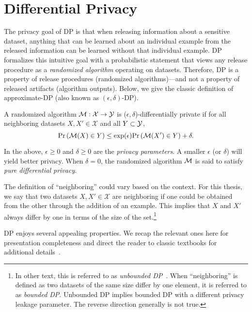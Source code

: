 \section{Differential Privacy}
The privacy goal of DP is that when releasing information about a sensitive dataset, anything that can be learned about an individual example from the released information can be learned without that individual example.
DP formalizes this intuitive goal with a probabilistic statement that views any release procedure as a \emph{randomized algorithm} operating on datasets.
Therefore, DP is a property of release procedures (randomized algorithms)---and not a property of released artifacts (algorithm outputs).
Below, we give the classic definition of approximate-DP (also known as $(\epsilon, \delta)$-DP).
\begin{defi}[Approximate-DP]
A randomized algorithm $\mathcal{M}: \mathcal{X} \to \mathcal{Y}$ is ($\epsilon, \delta$)-differentially private if for all neighboring datasets $X, X'\in\mathcal{X}$ and all $Y \subset \mathcal{Y}$, 
$$
\mathrm{Pr}\left(\mathcal{M}(X) \in Y\right) \le \exp( \epsilon ) \mathrm{Pr}\left( \mathcal{M}(X') \in Y \right) + \delta.
\label{eq:epsilon_delta_dp}
$$
\end{defi}
In the above, $\epsilon \ge 0$ and $\delta \ge 0$ are the \emph{privacy parameters}.
A smaller $\epsilon$ (or $\delta$) will yield better privacy.
When $\delta=0$, the randomized algorithm $\mathcal{M}$ is said to satisfy \emph{pure differential privacy}.

The definition of ``neighboring'' could vary based on the context. 
For this thesis, we say that two datasets $X, X' \in \mathcal{X}$ are neighboring if one could be obtained from the other through the addition of an example. 
This implies that $X$ and $X'$ always differ by one in terms of the size of the set.\footnote{
In other text, this is referred to as \emph{unbounded DP}~\cite{kifer2011no}. When ``neighboring'' is defined as two datasets of the same size differ by one element, it is referred to as \emph{bounded DP}.
Unbounded DP implies bounded DP with a different privacy leakage parameter.
The reverse direction generally is not true.
}

DP enjoys several appealing properties. 
We recap the relevant ones here for presentation completeness and direct the reader to classic textbooks for additional details~\cite{dwork2014algorithmic,vadhan2017complexity}.

